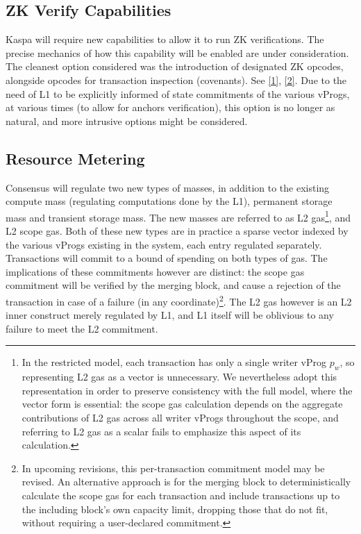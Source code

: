 \documentclass[onecolumn, 9pt, a4paper]{extarticle}
\begin{document}
\subsection{ZK Verify Capabilities}
Kaspa will require new capabilities to allow it to run ZK verifications. The precise mechanics of how this capability
will be enabled are under consideration. The cleanest option considered was the introduction of designated ZK
opcodes, alongside opcodes for transaction inspection (covenants). See \href{https://research.kas.pa/t/on-the-design-of-based-zk-rollups-over-kaspas-utxo-based-dag-consensus/208}{[1]}, \href{https://research.kas.pa/t/l1-l2-canonical-bridge-entry-exit-mechanism/258}{[2]}. Due to the need of L1
to be explicitly informed of state commitments of the various vProgs, at various times (to allow for anchors
verification), this option is no longer as natural, and more intrusive options might be considered.

\subsection{Resource Metering}
Consensus will regulate two new types of masses, in addition to the existing compute mass (regulating computations done by the L1), permanent storage mass and transient storage mass. The new masses are referred to as L2 gas\footnote{ In the restricted model, each transaction has only a single writer vProg $p_w$, so representing L2 gas as a vector is unnecessary. We nevertheless adopt this representation in order to preserve consistency with the full model, where the vector form is essential: the scope gas calculation depends on the aggregate contributions of L2 gas across all writer vProgs throughout the scope, and referring to L2 gas as a scalar fails to emphasize this aspect of its calculation.}, and L2 scope gas. Both of these new types are in practice a sparse vector indexed by the various vProgs existing in the system, each entry regulated separately. Transactions will commit to a bound of spending on both types of gas. The implications of these commitments however are distinct: the scope gas commitment will be verified by the merging block, and cause a rejection of the transaction in case of a failure (in any coordinate)\footnote{In upcoming revisions, this per-transaction commitment model may be revised. An alternative approach is for the merging block to deterministically calculate the scope gas for each transaction and include transactions up to the including block's own capacity limit, dropping those that do not fit, without requiring a user-declared commitment.}. The L2 gas however is an L2 inner construct merely regulated by L1, and L1 itself will be oblivious to any failure to meet the L2 commitment.  
\end{document}

